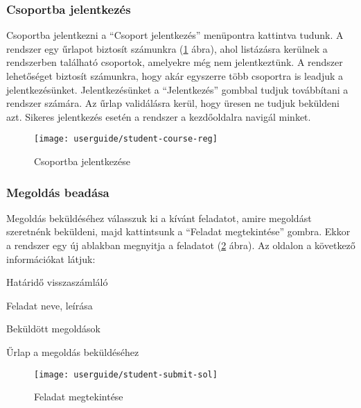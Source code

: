 \subsubsection{Csoportba jelentkezés}
\label{step:student-course-reg}
Csoportba jelentkezni a ``Csoport jelentkezés'' menüpontra kattintva tudunk. A rendszer egy űrlapot biztosít számunkra (\ref{fig:student-course-reg} ábra), ahol listázásra kerülnek a rendszerben található csoportok, amelyekre még nem jelentkeztünk. A rendszer lehetőséget biztosít számunkra, hogy akár egyszerre több csoportra is leadjuk a jelentkezésünket. Jelentkezésünket a ``Jelentkezés'' gombbal tudjuk továbbítani a rendszer számára. Az űrlap validálásra kerül, hogy üresen ne tudjuk beküldeni azt. Sikeres jelentkezés esetén a rendszer a kezdőoldalra navigál minket.
\begin{figure}[H]
	\centering
	\texttt{[image: userguide/student-course-reg]}
	\caption{Csoportba jelentkezése}
	\label{fig:student-course-reg}
\end{figure}
\subsubsection{Megoldás beadása}
\label{step:student-solution}
Megoldás beküldéséhez válasszuk ki a kívánt feladatot, amire megoldást szeretnénk beküldeni, majd kattintsunk a ``Feladat megtekintése'' gombra. Ekkor a rendszer egy új ablakban megnyitja a feladatot (\ref{fig:student-submit-sol} ábra). Az oldalon a következő információkat látjuk:
\begin{compactitem}
    \item Határidő visszaszámláló
    \item Feladat neve, leírása
    \item Beküldött megoldások
    \item Űrlap a megoldás beküldéséhez
\end{compactitem}
\begin{figure}[H]
	\centering
	\texttt{[image: userguide/student-submit-sol]}
	\caption{Feladat megtekintése}
	\label{fig:student-submit-sol}
\end{figure}
